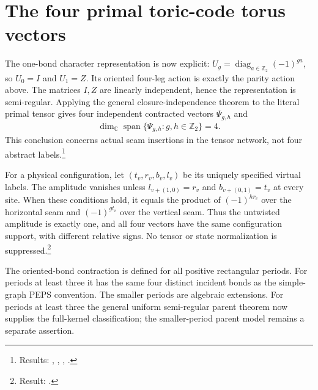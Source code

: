 \documentclass{article}
\begin{document}
\section{The four primal toric-code torus vectors}
The one-bond character representation is now explicit:
$U_g=\operatorname{diag}_{a\in\mathbb Z_2}(-1)^{ga}$, so $U_0=I$ and
$U_1=Z$. Its oriented four-leg action is exactly the parity action above.
The matrices $I,Z$ are linearly independent, hence the representation
is semi-regular. Applying the general closure-independence theorem to
the literal primal tensor gives four independent contracted vectors
$\Psi_{g,h}$ and
\begin{align}
    \dim_{\mathbb C}\operatorname{span}\{\Psi_{g,h}:g,h\in\mathbb Z_2\}=4.
\end{align}
This conclusion concerns actual seam insertions in the tensor network,
not four abstract labels.\footnote{Results:
    ,
    ,
    ,
    .}

For a physical configuration, let $(t_v,r_v,b_v,l_v)$ be its uniquely
specified virtual labels. The amplitude vanishes unless
$l_{v+(1,0)}=r_v$ and $b_{v+(0,1)}=t_v$ at every site. When these
conditions hold, it equals the product of $(-1)^{h r_v}$ over the
horizontal seam and $(-1)^{g t_v}$ over the vertical seam. Thus the
untwisted amplitude is exactly one, and all four vectors have the same
configuration support, with different relative signs. No tensor or
state normalization is suppressed.\footnote{Result:
    .}

The oriented-bond contraction is defined for all positive rectangular
periods. For periods at least three it has the same four distinct
incident bonds as the simple-graph PEPS convention. The smaller periods
are algebraic extensions. For periods at least three the general uniform
semi-regular parent theorem now supplies the full-kernel classification;
the smaller-period parent model remains a separate assertion.
\end{document}
